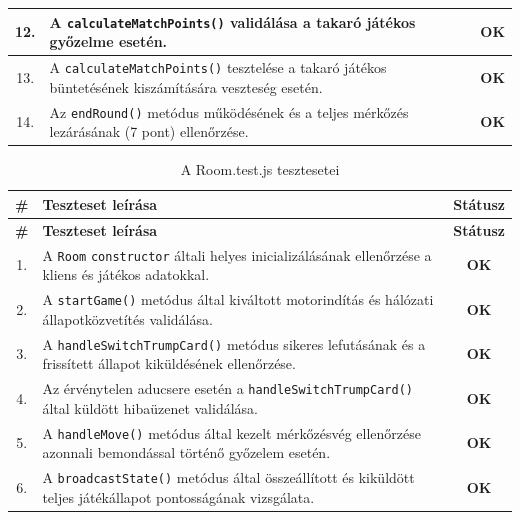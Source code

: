 \begin{longtable}{| c | m{11.5cm} | c |}
    12. & A \texttt{calculateMatchPoints()} validálása a takaró játékos győzelme esetén. & \cellcolor{green!40}\textbf{OK} \\ \hline
    13. & A \texttt{calculateMatchPoints()} tesztelése a takaró játékos büntetésének kiszámítására veszteség esetén. & \cellcolor{green!40}\textbf{OK} \\ \hline
    14. & Az \texttt{endRound()} metódus működésének és a teljes mérkőzés lezárásának (7 pont) ellenőrzése. & \cellcolor{green!40}\textbf{OK} \\ \hline
\end{longtable}

\vspace{1em}
\begin{longtable}{| c | m{11.5cm} | c |}
    \caption{A Room.test.js tesztesetei}
    \label{tab:test_room} \\
    \hline
    \textbf{\#} & \textbf{Teszteset leírása} & \textbf{Státusz} \\
    \hline
    \endfirsthead
    \hline
    \textbf{\#} & \textbf{Teszteset leírása} & \textbf{Státusz} \\
    \hline
    \endhead
    \hline
    \endlastfoot

    1. & A \texttt{Room} \texttt{constructor} általi helyes inicializálásának ellenőrzése a kliens és játékos adatokkal. & \cellcolor{green!40}\textbf{OK} \\ \hline
    2. & A \texttt{startGame()} metódus által kiváltott motorindítás és hálózati állapotközvetítés validálása. & \cellcolor{green!40}\textbf{OK} \\ \hline
    3. & A \texttt{handleSwitchTrumpCard()} metódus sikeres lefutásának és a frissített állapot kiküldésének ellenőrzése. & \cellcolor{green!40}\textbf{OK} \\ \hline
    4. & Az érvénytelen aducsere esetén a \texttt{handleSwitchTrumpCard()} által küldött hibaüzenet validálása. & \cellcolor{green!40}\textbf{OK} \\ \hline
    5. & A \texttt{handleMove()} metódus által kezelt mérkőzésvég ellenőrzése azonnali bemondással történő győzelem esetén. & \cellcolor{green!40}\textbf{OK} \\ \hline
    6. & A \texttt{broadcastState()} metódus által összeállított és kiküldött teljes játékállapot pontosságának vizsgálata. & \cellcolor{green!40}\textbf{OK} \\ \hline
\end{longtable}

